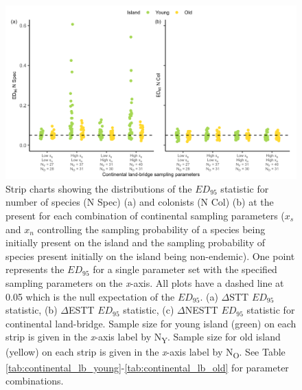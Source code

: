 \begin{figure}
    \centering
    \includegraphics[width=\textwidth]{JBI-21-0508_FigS14.png}
    \caption{Strip charts showing the distributions of the $ED_{95}$ statistic for number of species (N Spec) (a) and colonists (N Col) (b) at the present for each combination of continental sampling parameters ($x_s$ and $x_n$ controlling the sampling probability of a species being initially present on the island and the sampling probability of species present initially on the island being non-endemic). One point represents the $ED_{95}$ for a single parameter set with the specified sampling parameters on the \textit{x}-axis. All plots have a dashed line at 0.05 which is the null expectation of the $ED_{95}$. (a) $\Delta$STT $ED_{95}$ statistic, (b) $\Delta$ESTT $ED_{95}$ statistic, (c) $\Delta$NESTT $ED_{95}$ statistic for continental land-bridge. Sample size for young island (green) on each strip is given in the \textit{x}-axis label by N\textsubscript{Y}. Sample size for old island (yellow) on each strip is given in the \textit{x}-axis label by N\textsubscript{O}. See Table \ref{tab:continental_lb_young}-\ref{tab:continental_lb_old} for parameter combinations.}
    \label{fig:continental_land_bridge_sample_spec_col_facet_}
\end{figure}

